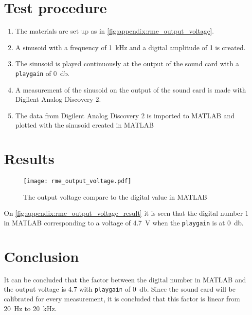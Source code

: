 \section*{Test procedure}


\begin{enumerate}
\item The materials are set up as in \autoref{fig:appendix:rme_output_voltage}.
\item A sinusoid with a frequency of \SI{1}{\kilo\hertz} and a digital amplitude of 1 is created.  
\item The sinusoid is played continuously at the output of the sound card with a \texttt{playgain} of  \SI{0}{\decibel}.
\item  A measurement of the sinusoid on the output of the sound card is made with Digilent Analog Discovery 2.
\item The data from Digilent Analog Discovery 2 is imported to MATLAB and plotted with the sinusoid created in MATLAB
\end{enumerate}

\section*{Results}

\begin{figure}[htbp!]
	\centering
		\texttt{[image: rme\_output\_voltage.pdf]}
		\caption{The output voltage compare to the digital value in MATLAB}
		\label{fig:appendix:rme_output_voltage_result}
\end{figure}

On  \autoref{fig:appendix:rme_output_voltage_result} it is seen that the digital number 1 in MATLAB corresponding to a voltage of \SI{4.7}{\volt} when the \texttt{playgain} is at \SI{0}{\decibel}. 

\section*{Conclusion}
It can be concluded that the factor between the digital number in MATLAB and the output voltage is 4.7 with \texttt{playgain} of \SI{0}{\decibel}. Since the sound card will be calibrated for every measurement, it is concluded that this factor is linear from \SI{20}{\hertz} to \SI{20}{\kilo\hertz}. 



